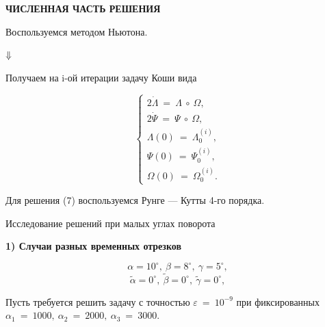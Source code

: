 \documentclass[14pt]{extreport}
\begin{document}
\newpage
\large
\begin{landscape}
\begin{center}
 \huge{\textbf{ЧИСЛЕННАЯ ЧАСТЬ РЕШЕНИЯ}}
\end{center}

\begin{center}
\Large{Воспользуемся методом Ньютона.}
\end{center}

\begin{center}
 $\Huge{\Downarrow}$
\end{center}

\begin{center}
\Large{Получаем на i-ой итерации задачу Коши вида}
\end{center}

\begin{equation}
\begin{cases}
2\dot{\Lambda}\ =\ \Lambda\ \circ\ \Omega, \\
2\dot{\Psi}\ =\ \Psi\ \circ\ \Omega,\\
\Lambda(0)\ =\ \Lambda_0^{(i)},\\
\Psi(0)\ =\ \Psi_0^{(i)},\\
\Omega(0)\ =\ \Omega_0^{(i)}.
 \end{cases}
\end{equation}

\begin{center}
Для решения (7) воспользуемся Рунге --- Кутты 4-го порядка.
\end{center}

\end{landscape}

\newpage
\Large
\begin{landscape}
\begin{center}
\Large{Исследование решений при малых углах поворота}
\end{center}
\begin{center}
 \textbf{1) Случаи разных временных отрезков}
\end{center}
\begin{equation}
 \alpha = 10^{\circ}, \ \beta = 8^{\circ},\ \gamma = 5^{\circ}, 
\end{equation}
\begin{equation}
 \widetilde{\alpha} = 0^{\circ}, \ \widetilde{\beta} = 0^{\circ},\ \widetilde{\gamma} = 0^{\circ}, 
\end{equation}
\begin{center}
 Пусть требуется решить задачу с точностью $\varepsilon\ =\ 10^{-9}$
при фиксированных $\alpha_1\ =\ 1000,\ \alpha_2\ =\ 2000,\ \alpha_3\ =\ 3000$. 
\end{center}
\end{landscape}
\end{document}
